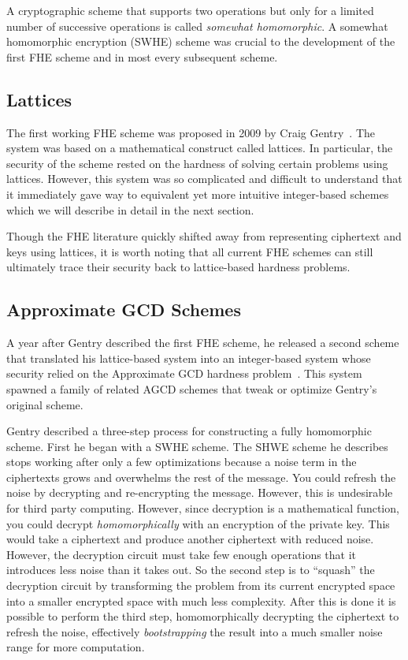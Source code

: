 \documentclass[letterpaper,twocolumn,10pt]{article}
\begin{document}
A cryptographic scheme that supports two operations but only for a limited number of successive operations is called \emph{somewhat homomorphic}. A somewhat homomorphic encryption (SWHE) scheme was crucial to the development of the first FHE scheme and in most every subsequent scheme.

\subsection{Lattices}
The first working FHE scheme was proposed in 2009 by Craig Gentry~\cite{GentryThesis09, GentrySTOC09}. The system was based on a mathematical construct called lattices. In particular, the security of the scheme rested on the hardness of solving certain problems using lattices. However, this system was so complicated and difficult to understand that it immediately gave way to equivalent yet more intuitive integer-based schemes~\cite{SmartVercauteren, DGHV} which we will describe in detail in the next section.

Though the FHE literature quickly shifted away from representing ciphertext and keys using lattices, it is worth noting that all current FHE schemes can still ultimately trace their security back to lattice-based hardness problems. 

\subsection{Approximate GCD Schemes}
A year after Gentry described the first FHE scheme, he released a second scheme that translated his lattice-based system into an integer-based system whose security relied on the Approximate GCD hardness problem~\cite{DGHV}. This system spawned a family of related AGCD schemes that tweak or optimize Gentry's original scheme.

Gentry described a three-step process for constructing a fully homomorphic scheme. First he began with a SWHE scheme. The SHWE scheme he describes stops working after only a few optimizations because a noise term in the ciphertexts grows and overwhelms the rest of the message. You could refresh the noise by decrypting and re-encrypting the message. However, this is undesirable for third party computing. However, since decryption is a mathematical function, you could decrypt \emph{homomorphically} with an encryption of the private key. This would take a ciphertext and produce another ciphertext with reduced noise. However, the decryption circuit must take few enough operations that it introduces less noise than it takes out. So the second step is to ``squash'' the decryption circuit by transforming the problem from its current encrypted space into a smaller encrypted space with much less complexity. After this is done it is possible to perform the third step, homomorphically decrypting the ciphertext to refresh the noise, effectively \emph{bootstrapping} the result into a much smaller noise range for more computation.
\end{document}
